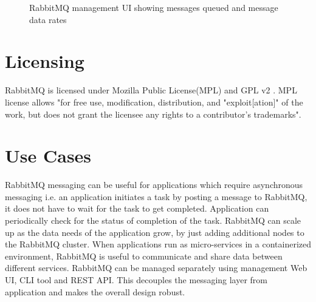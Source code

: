 \documentclass[9pt,twocolumn,twoside]{styles/osajnl}
\begin{document}
\begin{figure}[htbp]
\centering
{}
\caption{RabbitMQ management UI showing messages queued and message data rates\cite{www-rabbitmq-Johan}}
\label{fig:false-color}
\end{figure}

\section{Licensing}
RabbitMQ is licensed under Mozilla Public License(MPL) and GPL v2
\cite{www-rabbitmq-license}. MPL license \cite{www-mpl-license} allows "for free
use, modification, distribution, and "exploit[ation]" of the work, but does not
grant the licensee any rights to a contributor's trademarks".

\section{Use Cases}
RabbitMQ messaging can be useful for applications which require asynchronous
messaging i.e. an application initiates a task by posting a message to RabbitMQ,
it does not have to wait for the task to get completed. Application can
periodically check for the status of completion of the task. RabbitMQ can scale
up as the data needs of the application grow, by just adding additional nodes to
the RabbitMQ cluster. When applications run as micro-services in a containerized
environment, RabbitMQ is useful to communicate and share data between different
services. RabbitMQ can be managed separately using management Web UI, CLI tool
and REST API. This decouples the messaging layer from application and makes the
overall design robust. 
\end{document}
